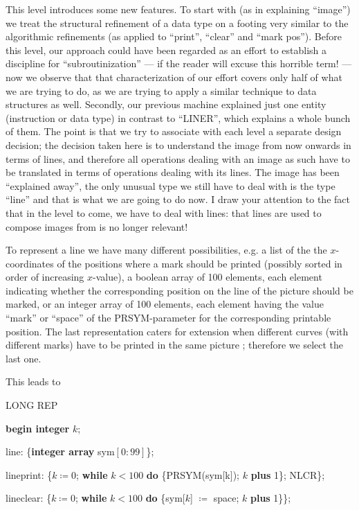 This level introduces some new features. To start with (as in explaining ``image'') we treat the structural refinement of a data type on a footing very similar to the algorithmic refinements (as applied to ``print'', ``clear'' and ``mark pos''). Before this level, our approach could have been regarded as an effort to establish a discipline for ``subroutinization'' --- if the reader will excuse this horrible term! --- now we observe that that characterization of  our effort covers only half of what we are trying to do, as we are trying to apply a similar technique to data structures as well. Secondly, our previous machine explained just one entity (instruction or data type) in contrast to ``LINER'', which explains a whole bunch of them. The point is that we try to associate with each level a separate design decision; the decision taken here is to understand the image from now onwards in terms of lines, and therefore all operations dealing with an image as such have to be translated in terms of operations dealing with its lines. The image has been ``explained away'', the only unusual type we still have to deal with is the type ``line'' and that is what we are going to do now. I draw your attention to the fact that in the level to come, we have to deal with lines: that lines are used to compose images from is no longer relevant!

To represent a line we have many different possibilities, e.g. a list of the the $x$-coordinates of the positions where a mark should be printed (possibly sorted in order of increasing $x$-value), a boolean array of 100 elements, each element indicating whether the corresponding position on the line of the picture should be marked, or an integer array of 100 elements, each element having the value ``mark'' or ``space'' of the PRSYM-parameter for the corresponding printable position. The last representation caters for extension when different curves (with different marks) have to be printed in the same picture ; therefore we select the last one.

This leads to

\noindent
LONG REP

\noindent
\textbf{begin integer} $k$;

\noindent
\quad line: \{\textbf{integer array} sym$[0 : 99]$\};

\noindent
\quad lineprint: \{$k \coloneq 0$; \textbf{while} $k < 100$ \textbf{do} \{PRSYM(sym[k$]$); $k$ \textbf{plus} 1\}; NLCR\};

\noindent
\quad lineclear: \{$k \coloneq 0$; \textbf{while} $k < 100$ \textbf{do} \{sym[$k$] $\coloneq$ space; $k$ \textbf{plus} 1\}\};

